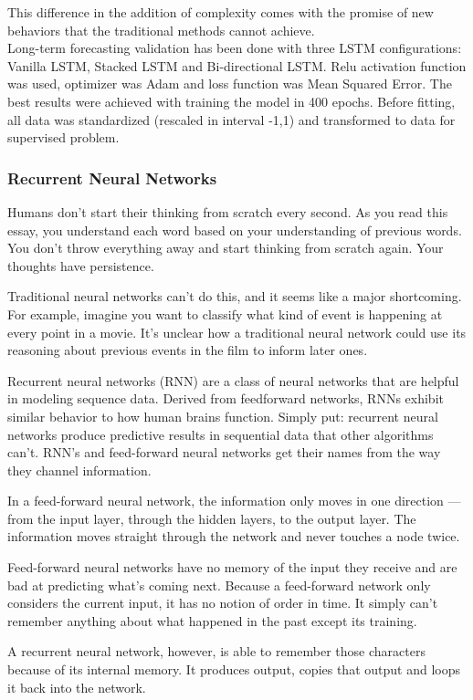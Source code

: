 \documentclass[12pt]{report}
\begin{document}
This difference in the addition of complexity comes with the promise of new behaviors that the traditional methods cannot achieve.\\
Long-term forecasting validation has been done with three LSTM configurations: Vanilla LSTM, Stacked LSTM and Bi-directional LSTM. Relu activation function was used, optimizer was Adam and loss function was Mean Squared Error. The best results were achieved with training the model in 400 epochs. Before fitting, all data was standardized (rescaled in interval -1,1) and transformed to data for supervised problem.

\subsubsection{Recurrent Neural Networks}
Humans don’t start their thinking from scratch every second. As you read this essay, you understand each word based on your understanding of previous words. You don’t throw everything away and start thinking from scratch again. Your thoughts have persistence.

Traditional neural networks can’t do this, and it seems like a major shortcoming. For example, imagine you want to classify what kind of event is happening at every point in a movie. It’s unclear how a traditional neural network could use its reasoning about previous events in the film to inform later ones. \cite{16}

Recurrent neural networks (RNN) are a class of neural networks that are helpful in modeling sequence data. Derived from feedforward networks, RNNs exhibit similar behavior to how human brains function. Simply put: recurrent neural networks produce predictive results in sequential data that other algorithms can’t.
RNN’s and feed-forward neural networks get their names from the way they channel information.

In a feed-forward neural network, the information only moves in one direction — from the input layer, through the hidden layers, to the output layer. The information moves straight through the network and never touches a node twice.

Feed-forward neural networks have no memory of the input they receive and are bad at predicting what’s coming next. Because a feed-forward network only considers the current input, it has no notion of order in time. It simply can’t remember anything about what happened in the past except its training.

A recurrent neural network, however, is able to remember those characters because of its internal memory. It produces output, copies that output and loops it back into the network.
\end{document}
